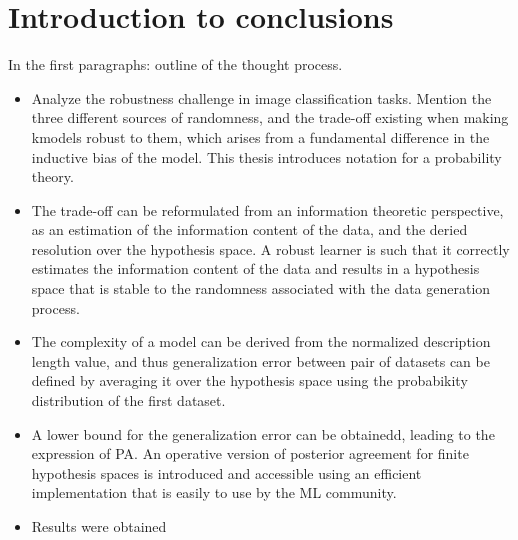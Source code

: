 \chapter{Introduction to conclusions}\label{sec:conclusions}

In the first paragraphs: outline of the thought process. \\

\begin{itemize}
    \item Analyze the robustness challenge in image classification tasks. Mention the three different
    sources of randomness, and the trade-off existing when making kmodels robust to them, which
    arises from a fundamental difference in the inductive bias of the model. This thesis introduces
    notation for a probability theory.\\
    \item The trade-off can be reformulated from an information theoretic perspective, as an estimation
    of the information content of the data, and the deried resolution over the hypothesis space. A robust learner
    is such that it correctly estimates the information content of the data and results in a hypothesis space that
    is stable to the randomness associated with the data generation process.  \\
    \item The complexity of a model can be derived from the normalized description length value, and thus generalization
    error between  pair of datasets can be defined by averaging it over the hypothesis space using the probabikity distribution
    of the first dataset. \\
    \item A lower bound for the generalization error can be obtainedd, leading to the expression of PA. An operative version of
    posterior agreement for finite hypothesis spaces is introduced and accessible using an efficient implementation that is easily
    to use by the ML community. \\
    \item Results were obtained 
\end{itemize}


